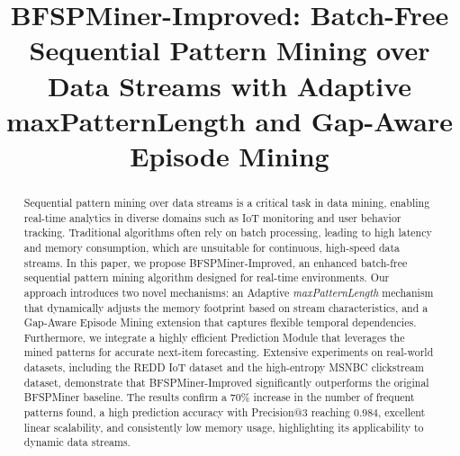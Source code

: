 \documentclass[conference]{IEEEtran}
\begin{document}
\title{BFSPMiner-Improved: Batch-Free Sequential Pattern Mining over Data Streams with Adaptive maxPatternLength and Gap-Aware Episode Mining}

\author{
\and
{}
}

\maketitle

\begin{abstract}
Sequential pattern mining over data streams is a critical task in data mining, enabling real-time analytics in diverse domains such as IoT monitoring and user behavior tracking. Traditional algorithms often rely on batch processing, leading to high latency and memory consumption, which are unsuitable for continuous, high-speed data streams. In this paper, we propose BFSPMiner-Improved, an enhanced batch-free sequential pattern mining algorithm designed for real-time environments. Our approach introduces two novel mechanisms: an Adaptive \textit{maxPatternLength} mechanism that dynamically adjusts the memory footprint based on stream characteristics, and a Gap-Aware Episode Mining extension that captures flexible temporal dependencies. Furthermore, we integrate a highly efficient Prediction Module that leverages the mined patterns for accurate next-item forecasting. Extensive experiments on real-world datasets, including the REDD IoT dataset and the high-entropy MSNBC clickstream dataset, demonstrate that BFSPMiner-Improved significantly outperforms the original BFSPMiner baseline. The results confirm a 70\% increase in the number of frequent patterns found, a high prediction accuracy with Precision@3 reaching 0.984, excellent linear scalability, and consistently low memory usage, highlighting its applicability to dynamic data streams.
\end{abstract}
\end{document}
